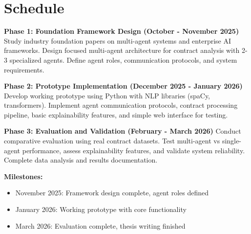 
\section{Schedule}\label{section:schedule}

\textbf{Phase 1: Foundation Framework Design (October - November 2025)}
Study industry foundation papers on multi-agent systems and enterprise AI frameworks. Design focused multi-agent architecture for contract analysis with 2-3 specialized agents. Define agent roles, communication protocols, and system requirements.

\textbf{Phase 2: Prototype Implementation (December 2025 - January 2026)}
Develop working prototype using Python with NLP libraries (spaCy, transformers). Implement agent communication protocols, contract processing pipeline, basic explainability features, and simple web interface for testing.

\textbf{Phase 3: Evaluation and Validation (February - March 2026)}
Conduct comparative evaluation using real contract datasets. Test multi-agent vs single-agent performance, assess explainability features, and validate system reliability. Complete data analysis and results documentation.

\textbf{Milestones:}
\begin{itemize}
    \item November 2025: Framework design complete, agent roles defined
    \item January 2026: Working prototype with core functionality
    \item March 2026: Evaluation complete, thesis writing finished
\end{itemize}
